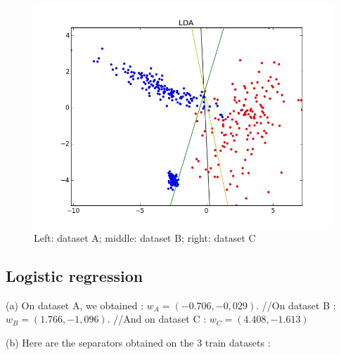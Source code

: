 \documentclass[11pt,a4paper]{article}
\begin{document}
\begin{figure}[H]
\noindent\includegraphics[scale=0.3]{images/LDA_C.jpeg}
\caption{Left: dataset A; middle: dataset B; right: dataset C}
\end{figure}

\subsection{Logistic regression}

(a) On dataset A, we obtained : $w_A = (-0.706, -0,029)$.
//On dataset B : $w_B = (1.766, -1,096)$.
//And on dataset C : $w_C = (4.408, -1.613)$

\medskip
(b) Here are the separators obtained on the 3 train datasets : 
\end{document}
